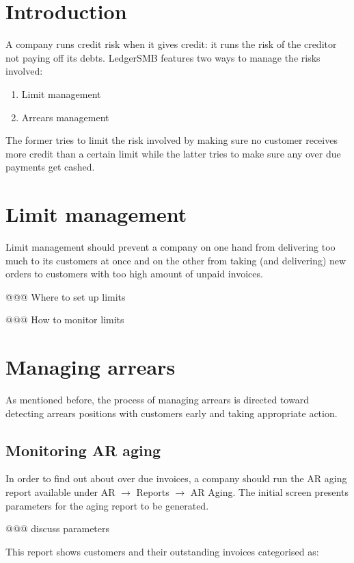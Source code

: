 \section{Introduction}

A company runs credit risk when it gives credit: it runs the risk of the
creditor not paying off its debts.  LedgerSMB features two ways to manage
the risks involved:

\begin{enumerate}
\item Limit management
\item Arrears management
\end{enumerate}

The former tries to limit the risk involved by making sure no customer
receives more credit than a certain limit while the latter tries to
make sure any over due payments get cashed.

\section{Limit management}

Limit management should prevent a company on one hand from delivering too much
to its customers at once and on the other from taking (and delivering) new orders
to customers with too high amount of unpaid invoices.

@@@ Where to set up limits

@@@ How to monitor limits


\section{Managing arrears}

As mentioned before, the process of managing arrears is directed toward
detecting arrears positions with customers early and taking appropriate
action.


\subsection{Monitoring AR aging}

In order to find out about over due invoices, a company should run the AR
aging report available under AR $\rightarrow$ Reports $\rightarrow$ AR Aging.
The initial screen presents parameters for the aging report to be generated.

@@@ discuss parameters

This report shows customers and their outstanding invoices categorised as:

